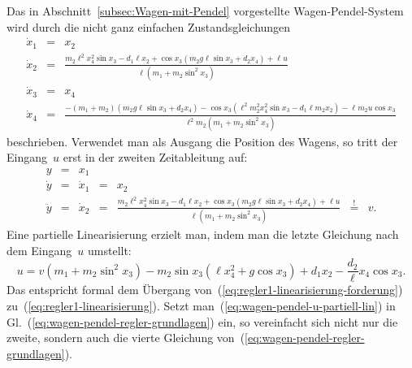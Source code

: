 \begin{example}
\label{exa:Wagen-Pendel-partielle-Linearisierung}Das in Abschnitt~\ref{subsec:Wagen-mit-Pendel}
vorgestellte Wagen-Pendel-System wird durch die nicht ganz einfachen
Zustandsgleichungen
\begin{equation}
\begin{array}{lcl}
\dot{x}_{1} & = & x_{2}\\
\dot{x}_{2} & = & \frac{m_{2}\ell^{2}x_{4}^{2}\sin x_{3}-d_{1}\ell x_{2}+\cos x_{3}\left(m_{2}g\ell\sin x_{3}+d_{2}x_{4}\right)+\ell u}{\ell\left(m_{1}+m_{2}\sin^{2}x_{3}\right)}\\
\dot{x}_{3} & = & x_{4}\\
\dot{x}_{4} & = & \frac{-\left(m_{1}+m_{2}\right)\left(m_{2}g\ell\sin x_{3}+d_{2}x_{4}\right)-\cos x_{3}\left(\ell^{2}m_{2}^{2}x_{4}^{2}\sin x_{3}-d_{1}\ell m_{2}x_{2}\right)-\ell m_{2}u\cos x_{3}}{\ell^{2}m_{2}\left(m_{1}+m_{2}\sin^{2}x_{3}\right)}
\end{array}\label{eq:wagen-pendel-regler-grundlagen}
\end{equation}
beschrieben. Verwendet man als Ausgang die Position des Wagens, so
tritt der Eingang~$u$ erst in der zweiten Zeitableitung auf:
\begin{equation}
\begin{array}{lclclcl}
y & = & x_{1}\\
\dot{y} & = & \dot{x}_{1} & = & x_{2}\\
\ddot{y} & = & \dot{x}_{2} & = & \frac{m_{2}\ell^{2}x_{4}^{2}\sin x_{3}-d_{1}\ell x_{2}+\cos x_{3}\left(m_{2}g\ell\sin x_{3}+d_{2}x_{4}\right)+\ell u}{\ell\left(m_{1}+m_{2}\sin^{2}x_{3}\right)} & \stackrel{!}{=} & v.
\end{array}\label{eq:wagen-pendel-zeitableitungen}
\end{equation}
Eine partielle Linearisierung erzielt man, indem man die letzte Gleichung
nach dem Eingang~$u$ umstellt: 
\begin{equation}
u=v\left(m_{1}+m_{2}\sin^{2}x_{3}\right)-m_{2}\sin x_{3}\left(\ell x_{4}^{2}+g\cos x_{3}\right)+d_{1}x_{2}-\frac{d_{2}}{\ell}x_{4}\cos x_{3}.\label{eq:wagen-pendel-u-partiell-lin}
\end{equation}
Das entspricht formal dem Übergang von~(\ref{eq:regler1-linearisierung-forderung})
zu~(\ref{eq:regler1-linearisierung}). Setzt man~(\ref{eq:wagen-pendel-u-partiell-lin})
in Gl.~(\ref{eq:wagen-pendel-regler-grundlagen}) ein, so vereinfacht
sich nicht nur die zweite, sondern auch die vierte Gleichung von~(\ref{eq:wagen-pendel-regler-grundlagen}).

\end{example}
